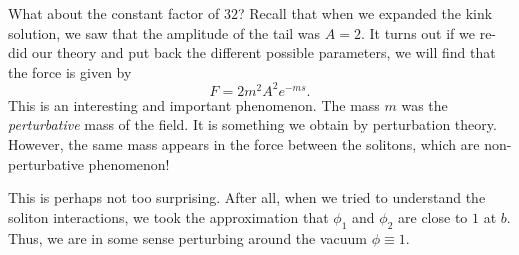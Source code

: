 \documentclass[a4paper]{article}
\begin{document}
What about the constant factor of $32$? Recall that when we expanded the kink solution, we saw that the amplitude of the tail was $A = 2$. It turns out if we re-did our theory and put back the different possible parameters, we will find that the force is given by
\[
  F = 2 m^2 A^2 e^{-ms}.
\]
This is an interesting and important phenomenon. The mass $m$ was the \emph{perturbative} mass of the field. It is something we obtain by perturbation theory. However, the same mass appears in the force between the solitons, which are non-perturbative phenomenon!

This is perhaps not too surprising. After all, when we tried to understand the soliton interactions, we took the approximation that $\phi_1$ and $\phi_2$ are close to $1$ at $b$. Thus, we are in some sense perturbing around the vacuum $\phi \equiv 1$.

%
%
\end{document}
